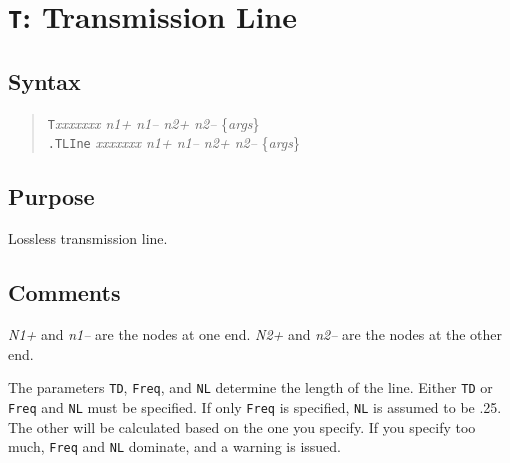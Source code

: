 %
%
%
%
\section{{\tt T}: Transmission Line}
\subsection{Syntax}
\begin{verse}
{\tt T}{\it xxxxxxx n1+ n1-- n2+ n2--} \{{\it args}\}\\
{\tt .TLIne} {\it xxxxxxx n1+ n1-- n2+ n2--} \{{\it args}\}
\end{verse}
\subsection{Purpose}

Lossless transmission line.
\subsection{Comments}

{\it N1+} and {\it n1--} are the nodes at one end.  {\it N2+} and {\it
n2--} are the nodes at the other end.

The parameters {\tt TD}, {\tt Freq}, and {\tt NL} determine the length
of the line.  Either {\tt TD} or {\tt Freq} and {\tt NL} must be
specified.  If only {\tt Freq} is specified, {\tt NL} is assumed to be
.25.  The other will be calculated based on the one you specify.  If
you specify too much, {\tt Freq} and {\tt NL} dominate, and a warning
is issued.
